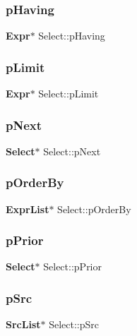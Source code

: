 \mbox{\label{struct_select_ad09e0b115e6e1599e3075b87dfa6e66e}} 
\subsubsection{pHaving}
{\footnotesize\ttfamily \textbf{ Expr}$\ast$ Select\+::p\+Having}

\mbox{\label{struct_select_a11d3b48d04d58be818cdefb10aa061a0}} 
\subsubsection{pLimit}
{\footnotesize\ttfamily \textbf{ Expr}$\ast$ Select\+::p\+Limit}

\mbox{\label{struct_select_a96aa0caf60390b8f5e88589639205c40}} 
\subsubsection{pNext}
{\footnotesize\ttfamily \textbf{ Select}$\ast$ Select\+::p\+Next}

\mbox{\label{struct_select_a73c474cd4a9a9b9aa4e3187d8bf2d886}} 
\subsubsection{pOrderBy}
{\footnotesize\ttfamily \textbf{ Expr\+List}$\ast$ Select\+::p\+Order\+By}

\mbox{\label{struct_select_a51d1a253b0aba5a54b11b3bf3896d056}} 
\subsubsection{pPrior}
{\footnotesize\ttfamily \textbf{ Select}$\ast$ Select\+::p\+Prior}

\mbox{\label{struct_select_a4e3b9b176a8e1b4af988405ff1f090db}} 
\subsubsection{pSrc}
{\footnotesize\ttfamily \textbf{ Src\+List}$\ast$ Select\+::p\+Src}

